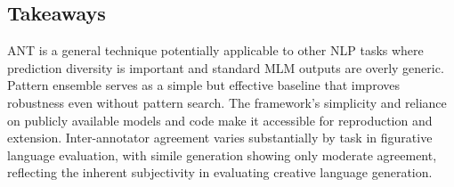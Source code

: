 \documentclass[12pt]{article}
\begin{document}
\subsection{Takeaways}

ANT is a general technique potentially applicable to other NLP tasks where prediction diversity is important and standard MLM outputs are overly generic. Pattern ensemble serves as a simple but effective baseline that improves robustness even without pattern search. The framework's simplicity and reliance on publicly available models and code make it accessible for reproduction and extension. Inter-annotator agreement varies substantially by task in figurative language evaluation, with simile generation showing only moderate agreement, reflecting the inherent subjectivity in evaluating creative language generation.
\end{document}
